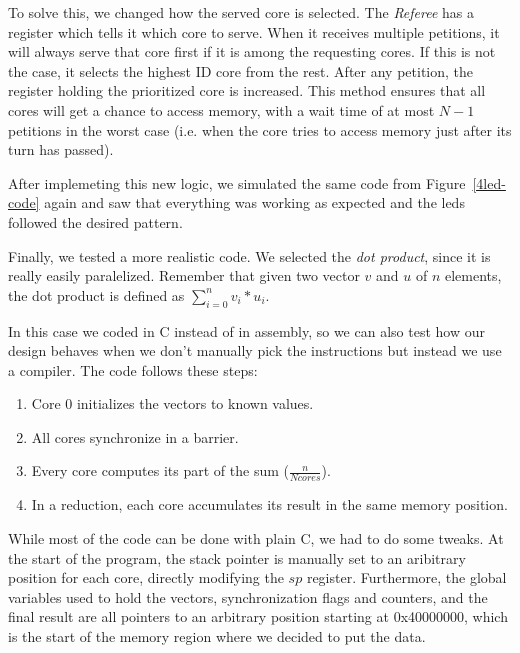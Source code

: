 To solve this, we changed how the served core is selected.
The \textit{Referee} has a register which tells it which core to serve. 
When it receives multiple petitions, it will always serve that core first if it is among the requesting cores.
If this is not the case, it selects the highest ID core from the rest.
After any petition, the register holding the prioritized core is increased.
This method ensures that all cores will get a chance to access memory, with a wait time of at most $N-1$ petitions in the worst case (i.e. when the core tries to access memory just after its turn has passed).


After implemeting this new logic, we simulated the same code from Figure~\ref{4led-code} again and saw that everything was working as expected and the leds followed the desired pattern.

Finally, we tested a more realistic code.
We selected the \textit{dot product}, since it is really easily paralelized.
Remember that given two vector $v$ and $u$ of $n$ elements, the dot product is defined as $\sum_{i=0}^{n}{v_{i} * u_{i}}$.

In this case we coded in C instead of in assembly, so we can also test how our design behaves when we don't manually pick the instructions but instead we use a compiler.
The code follows these steps:

\begin{enumerate}
	\item Core 0 initializes the vectors to known values.
	\item All cores synchronize in a barrier.
	\item Every core computes its part of the sum ($\frac{n}{Ncores}$).
	\item In a reduction, each core accumulates its result in the same memory position.
\end{enumerate}

While most of the code can be done with plain C, we had to do some tweaks.
At the start of the program, the stack pointer is manually set to an aribitrary position for each core, directly modifying the $sp$ register.
Furthermore, the global variables used to hold the vectors, synchronization flags and counters, and the final result are all pointers to an arbitrary position starting at 0x40000000, which is the start of the memory region where we decided to put the data.


